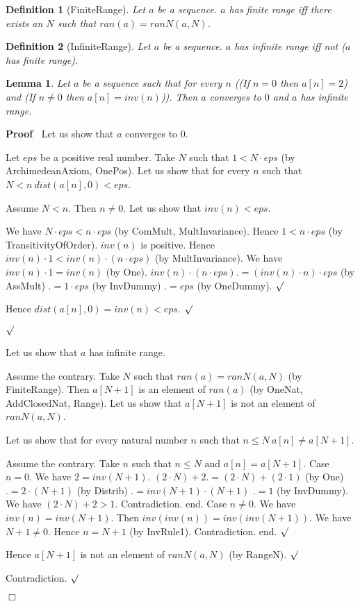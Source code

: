 \documentclass{article}
\newenvironment{forthel}{\begin{leftbar}}{\end{leftbar}}
\newenvironment{proof}{\noindent\textbf{Proof\ }}{\hspace*{\fill}$\Box$\medskip}
\newenvironment{subproof}{\begin{list}{}{}
		\item[\text{Proof}]}{\hfill $\surd$ \end{list}}
\newtheorem{lemma}{Lemma}
\newtheorem{definition}{Definition}
\begin{document}
\begin{forthel}
	\begin{definition}[FiniteRange]	Let $a$ be a sequence. $a$ has finite range iff there exists an $N$ such that $ran(a) = ranN(a,N)$.
	\end{definition}

	\begin{definition}[InfiniteRange] Let $a$ be a sequence. $a$ has infinite range iff not ($a$ has finite range).
	\end{definition}
	
	\begin{lemma} Let $a$ be a sequence such that for every $n$
	((If $n = 0$ then $a[n] = 2$) and (If $n \neq 0$ then $a[n] = inv(n)$)).
	Then $a$ converges to $0$ and $a$ has infinite range.
	\end{lemma}
	\begin{proof} Let us show that $a$ converges to $0$.
	\begin{subproof}
	Let $eps$ be a positive real number. 
	Take $N$ such that $1 < N \cdot eps$ (by ArchimedeanAxiom, OnePos).
	Let us show that for every $n$ such that $N < n \ dist(a[n],0) < eps$.
	\begin{subproof}
	Assume $N < n$. Then $n \neq 0$.
	Let us show that $inv(n) < eps$.
	\begin{subproof}
	We have $N \cdot eps < n \cdot eps$ (by ComMult, MultInvariance).
	Hence $1 < n \cdot eps$ (by TransitivityOfOrder).
	$inv(n)$ is positive.
	Hence $inv(n) \cdot 1 < inv(n) \cdot (n \cdot eps)$ (by MultInvariance).
	We have $inv(n) \cdot 1 = inv(n)$ (by One).
	$inv(n) \cdot (n \cdot eps) .= (inv(n) \cdot n) \cdot eps$ (by AssMult)
	$.= 1 \cdot eps$ (by InvDummy)
	$.= eps$ (by OneDummy).
	\end{subproof}
	Hence $dist(a[n],0) = inv(n) < eps$.
	\end{subproof}
	\end{subproof}
	Let us show that $a$ has infinite range.
	\begin{subproof}
	Assume the contrary.
	Take $N$ such that $ran(a) = ranN(a,N)$ (by FiniteRange).
	Then $a[N + 1]$ is an element of $ran(a)$ (by OneNat, AddClosedNat, Range).
	Let us show that $a[N + 1]$ is not an element of $ranN(a,N)$.
	\begin{subproof}
	Let us show that for every natural number $n$ such that $n \leq N \ a[n] \neq a[N + 1]$.
	\begin{subproof}
	Assume the contrary.
	Take $n$ such that $n \leq N \text{ and } a[n] = a[N + 1]$.
	Case $n = 0$.
	We have $2 = inv(N + 1)$.
	$(2 \cdot N) + 2 .= (2 \cdot N) + (2 \cdot 1)$ (by One)
	$.= 2 \cdot (N + 1)$ (by Distrib)
	$.= inv(N + 1) \cdot (N + 1)$
	$.= 1$ (by InvDummy).
	We have $(2 \cdot N) + 2 > 1$.
	Contradiction.
	end.
	Case $n \neq 0$.
	We have $inv(n) = inv(N + 1)$.
	Then $inv(inv(n)) = inv(inv(N + 1))$.
	We have $N + 1 \neq 0$.
	Hence $n = N + 1$ (by InvRule1).
	Contradiction.
	end.
	\end{subproof}
	Hence $a[N + 1]$ is not an element of $ranN(a,N)$ (by RangeN).
	\end{subproof}
	Contradiction.
	\end{subproof}
	\end{proof}
	

\end{forthel}
\end{document}
